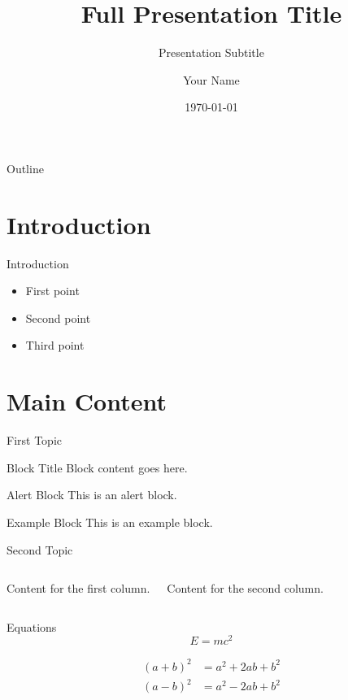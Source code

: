 \documentclass{beamer}
\title[Short Title]{Full Presentation Title}
\subtitle{Presentation Subtitle}
\author[Author]{Your Name}
\institute[Institute]{Your Institute or Organization}
\date{\today}
\begin{document}
\begin{frame}
    \titlepage
\end{frame}

\begin{frame}{Outline}
    \tableofcontents
\end{frame}

\section{Introduction}

\begin{frame}{Introduction}
    \begin{itemize}
        \item First point
        \item Second point
        \item Third point
    \end{itemize}
\end{frame}

\section{Main Content}

\begin{frame}{First Topic}
    \begin{block}{Block Title}
        Block content goes here.
    \end{block}
    
    \begin{alertblock}{Alert Block}
        This is an alert block.
    \end{alertblock}
    
    \begin{exampleblock}{Example Block}
        This is an example block.
    \end{exampleblock}
\end{frame}

\begin{frame}{Second Topic}
    \begin{columns}
        Content for the first column.
        
        Content for the second column.
    \end{columns}
\end{frame}

\begin{frame}{Equations}
    \begin{equation}
        E = mc^2
    \end{equation}
    
    \begin{align}
        (a+b)^2 &= a^2 + 2ab + b^2\\
        (a-b)^2 &= a^2 - 2ab + b^2
    \end{align}
\end{frame}
\end{document}
